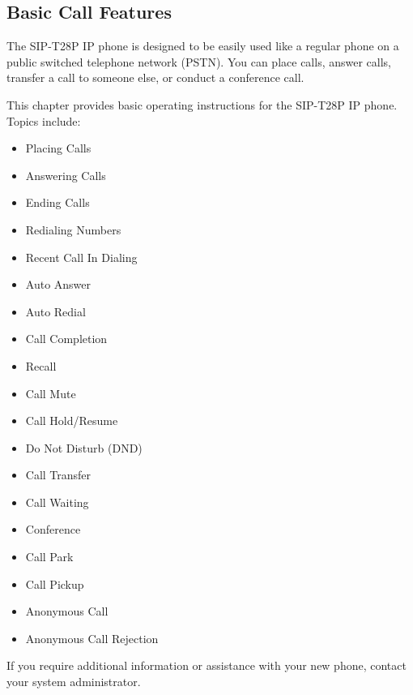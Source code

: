 \subsection{Basic Call Features}
The SIP-T28P IP phone is designed to be easily used like a regular phone
on a public switched telephone network (PSTN). You can place calls,
answer calls, transfer a call to someone else, or conduct a conference
call.

This chapter provides basic operating instructions for the SIP-T28P IP
phone. Topics include:

\begin{itemize}
	\item Placing Calls
	\item Answering Calls
	\item Ending Calls
	\item Redialing Numbers
	\item Recent Call In Dialing
	\item Auto Answer
	\item Auto Redial
	\item Call Completion
	\item Recall
	\item Call Mute
	\item Call Hold/Resume
	\item Do Not Disturb (DND)
	\item Call Transfer
	\item Call Waiting
	\item Conference
	\item Call Park
	\item Call Pickup
	\item Anonymous Call
	\item Anonymous Call Rejection
\end{itemize}

If you require additional information or assistance with your new phone,
contact your system administrator.











